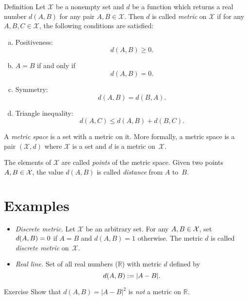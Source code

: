 \begin{thm}{Definition}\label{def:metric-space}
Let $\mathcal X$ be a nonempty set and 
$d$ be a function
which returns a real number $d(A,B)$
for any pair $A,B\in\mathcal X$.
Then $d$
is called \emph{metric} on 
$\mathcal X$ if for any
$A,B,C\in \mathcal X$, the following conditions are satisfied:
\begin{enumerate}[(a)]
\item\label{def:metric-space:a} Positiveness: 
$$d(A,B)\ge 0.$$
\item\label{def:metric-space:b} $A=B$ if and only if 
$$d(A,B)=0.$$
\item\label{def:metric-space:c} Symmetry: $$d(A, B) = d(B, A).$$
\item\label{def:metric-space:d} Triangle inequality: 
$$d(A, C) \le d(A, B) + d(B, C).$$
\end{enumerate}
A \emph{metric space} is a set with a metric on it. 
More formally, a metric space is a pair $(\mathcal X, d)$ where $\mathcal X$ is a set and $d$ is a metric on~$\mathcal X$.

The elements of $\mathcal X$ are called \emph{points} of the metric space.
Given two points $A,B\z\in \mathcal X$, 
the value $d(A, B)$ is called \emph{distance} from $A$ to~$B$.
\end{thm}

\section*{Examples}

\begin{itemize}
\item {}\emph{Discrete metric.} Let $\mathcal X$ be an arbitrary set. 
For any $A,B\z\in\mathcal X$, 
set $d(A,B)\z=0$ if $A=B$ and $d(A,B)=1$ otherwise.
The metric $d$ is called \emph{discrete metric} on~$\mathcal X$.
\item{}\emph{Real line.}
Set of all real numbers ($\mathbb{R}$) with metric $d$ defined by 
$$d(A,B):=|A-B|.$$
\end{itemize}

\begin{thm}{Exercise}\label{ex:dist-square}
Show that $d(A,B)=|A-B|^2$ is {}\emph{not} a metric on $\mathbb{R}$.
\end{thm}

